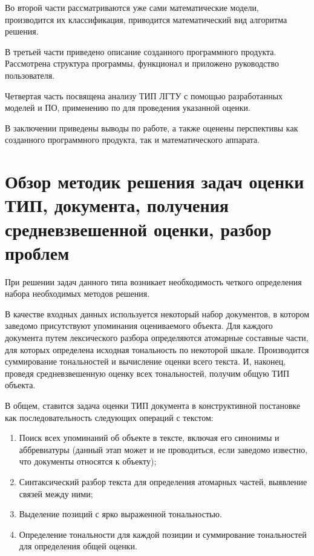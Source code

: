 \documentclass[a4paper,14pt,russian]{extreport}
\begin{document}
Во второй части рассматриваются уже сами математические модели, производится их классификация, приводится математический вид алгоритма решения.

В третьей части приведено описание созданного программного продукта. Рассмотрена структура программы, функционал и приложено руководство пользователя.

Четвертая часть посвящена анализу \mbox{ТИП} \mbox{ЛГТУ} с помощью разработанных моделей и \mbox{ПО}, применению по для проведения указанной оценки.

В заключении приведены выводы по работе, а также оценены перспективы как созданного программного продукта, так и математического аппарата.
\newpage

\chapter{Обзор методик решения задач оценки ТИП, документа, получения средневзвешенной оценки, разбор проблем}

При решении задач данного типа возникает необходимость четкого определения набора необходимых методов решения.

В качестве входных данных используется некоторый набор документов, в котором заведомо присутствуют упоминания оцениваемого объекта. Для каждого документа путем лексического разбора определяются атомарные составные части, для которых определена исходная тональность по некоторой шкале. Производится суммирование тональностей и вычисление оценки всего текста. И, наконец, проведя средневзвешенную оценку всех тональностей, получим общую \mbox{ТИП} объекта.

В общем, ставится задача оценки \mbox{ТИП} документа в конструктивной постановке как последовательность следующих операций с текстом:

\begin{enumerate}
\item Поиск всех упоминаний об объекте в тексте, включая его синонимы и аббревиатуры (данный этап может и не проводиться, если заведомо известно, что документы относятся к объекту);
\item Синтаксический разбор текста для определения атомарных частей, выявление связей между ними;
\item Выделение позиций с ярко выраженной тональностью.
\item Определение тональности для каждой позиции и суммирование тональностей для определения общей оценки.
\end{enumerate}
\end{document}
